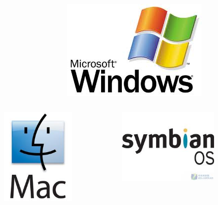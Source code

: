 \documentclass[compress=true]{beamer}
\begin{document}
\begin{frame}
\begin{itemize}
\begin{columns}
\begin{column}{0.333\textwidth}
\begin{figure}
					\end{figure}
				\end{column}
				\begin{column}{0.334\textwidth}
					\begin{figure}
						\includegraphics[height=0.2\textheight]{windows.png}
					\end{figure}
				\end{column}
			\end{columns}
			\begin{columns}
				\begin{column}{0.2\textwidth}
					\begin{figure}
						\includegraphics[height=0.2\textheight]{mac.png}
					\end{figure}
				\end{column}
				\begin{column}{0.2\textwidth}
					\begin{figure}
						\includegraphics[height=0.15\textheight]{s60.png}

\end{figure}
\end{column}
\end{columns}
\end{itemize}
\end{frame}
\end{document}
